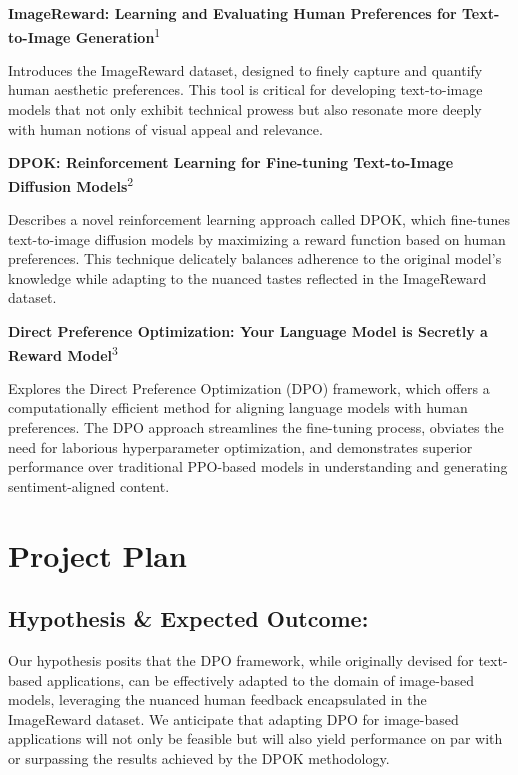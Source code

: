 \documentclass[12pt]{article}
\newcommand{\literatureitem}[3]{
  \begin{center}
    \textbf{#1}\textsuperscript{#2}
  \end{center}
  #3
}
\begin{document}
\literatureitem{ImageReward: Learning and Evaluating Human Preferences for Text-to-Image Generation}{1}{\vspace{-0.5cm}
  Introduces the ImageReward dataset, designed to finely capture and quantify human aesthetic preferences. This tool is critical for developing text-to-image models that not only exhibit technical prowess but also resonate more deeply with human notions of visual appeal and relevance.
}

\literatureitem{DPOK: Reinforcement Learning for Fine-tuning Text-to-Image Diffusion Models}{2}{\vspace{-0.5cm}
 Describes a novel reinforcement learning approach called DPOK, which fine-tunes text-to-image diffusion models by maximizing a reward function based on human preferences. This technique delicately balances adherence to the original model's knowledge while adapting to the nuanced tastes reflected in the ImageReward dataset.
}

\literatureitem{Direct Preference Optimization: Your Language Model is Secretly a Reward Model}{3}{\vspace{-0.5cm}
  Explores the Direct Preference Optimization (DPO) framework, which offers a computationally efficient method for aligning language models with human preferences. The DPO approach streamlines the fine-tuning process, obviates the need for laborious hyperparameter optimization, and demonstrates superior performance over traditional PPO-based models in understanding and generating sentiment-aligned content.
}


\newpage



\section*{Project Plan}
\vspace{-0.4cm}
\subsection*{Hypothesis \& Expected Outcome:}
Our hypothesis posits that the DPO framework, while originally devised for text-based applications, can be effectively adapted to the domain of image-based models, leveraging the nuanced human feedback encapsulated in the ImageReward dataset. We anticipate that adapting DPO for image-based applications will not only be feasible but will also yield performance on par with or surpassing the results achieved by the DPOK methodology.
\end{document}
